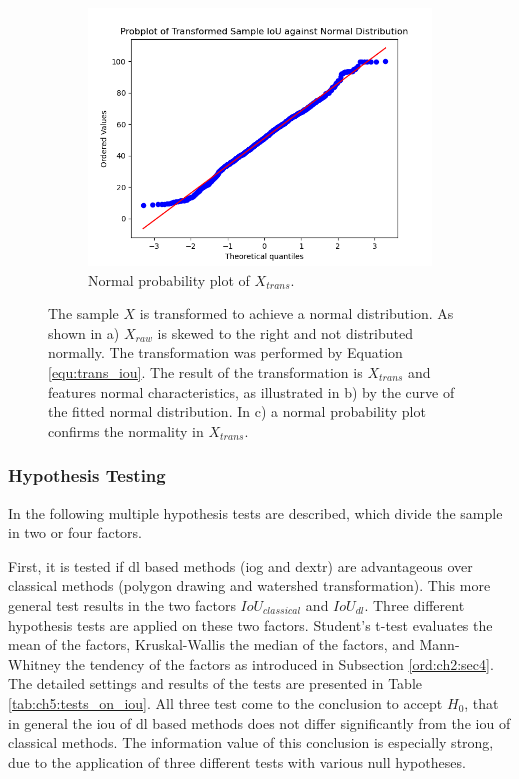 \begin{figure} [h]
	\hfill
	\begin{subfigure}[t]{0.3\textwidth}
		\centering
		\includegraphics[width=\textwidth]{figures/chap51_iou_probplot.png}
		\caption{
			Normal probability plot of $ X_{trans} $.
		}\label{fig:ch5:sec1:probplot}
	\end{subfigure}
	\caption[IoU Sample Transformation]{		
		The sample $ X $ is transformed to achieve a normal distribution.
		As shown in a) $ X_{raw} $ is skewed to the right and not distributed normally.
		The transformation was performed by Equation \ref{equ:trans_iou}.
		The result of the transformation is $ X_{trans} $ and features normal characteristics, as illustrated in b) by the curve of the fitted normal distribution.
		In c) a normal probability plot confirms the normality in $ X_{trans} $.
	}\label{fig:ch5:sec1:data_transformation_iou}
\end{figure}


\subsubsection{Hypothesis Testing}

In the following multiple hypothesis tests are described, which divide the sample in two or four factors.

First, it is tested if \gls{dl} based methods (\gls{iog} and \gls{dextr}) are advantageous over classical methods (polygon drawing and watershed transformation).
This more general test results in the two factors $ IoU_{classical} $ and $ IoU_{dl} $.
Three different hypothesis tests are applied on these two factors.
Student's t-test evaluates the mean of the factors, Kruskal-Wallis the median of the factors, and Mann-Whitney the tendency of the factors as introduced in Subsection \ref{ord:ch2:sec4}.
The detailed settings and results of the tests are presented in Table \ref{tab:ch5:tests_on_iou}.
All three test come to the conclusion to accept $ H_{0} $, that in general the \gls{iou} of \gls{dl} based methods does not differ significantly from the \gls{iou} of classical methods.
The information value of this conclusion is especially strong, due to the application of three different tests with various null hypotheses.

